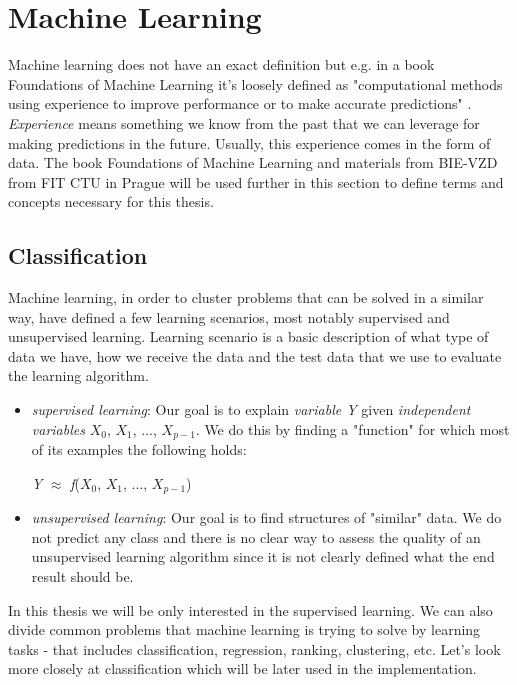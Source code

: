 \section{Machine Learning}

Machine learning does not have an exact definition but e.g. in a book Foundations of Machine Learning it's loosely defined as "computational methods using experience to improve performance or to make accurate predictions" \cite{ml-foundations}. \textit{Experience} means something we know from the past that we can leverage for making predictions in the future. Usually, this experience comes in the form of data. The book Foundations of Machine Learning \cite{ml-foundations} and materials from BIE-VZD from FIT CTU in Prague \cite{vzd-lectures} will be used further in this section to define terms and concepts necessary for this thesis.

\subsection{Classification}

Machine learning, in order to cluster problems that can be solved in a similar way, have defined a few learning scenarios, most notably supervised and unsupervised learning. Learning scenario is a basic description of what type of data we have, how we receive the data and the test data that we use to evaluate the learning algorithm.

\begin{itemize}
    \item \textit{supervised learning}: Our goal is to explain \textit{variable Y} given \textit{independent variables} $\textit{X}_0$, $\textit{X}_1$, ..., $\textit{X}_{\textit{p} - 1}$. We do this by finding a "function" for which most of its examples the following holds:\\
    \centerline{\textit{Y} $\approx$ \textit{f}($\textit{X}_0$, $\textit{X}_1$, ..., $\textit{X}_{\textit{p} - 1}$)}
    \item \textit{unsupervised learning}: Our goal is to find structures of "similar" data. We do not predict any class and there is no clear way to assess the quality of an unsupervised learning algorithm since it is not clearly defined what the end result should be.
\end{itemize}

In this thesis we will be only interested in the supervised learning. We can also divide common problems that machine learning is trying to solve by learning tasks - that includes classification, regression, ranking, clustering, etc. Let's look more closely at classification which will be later used in the implementation.

